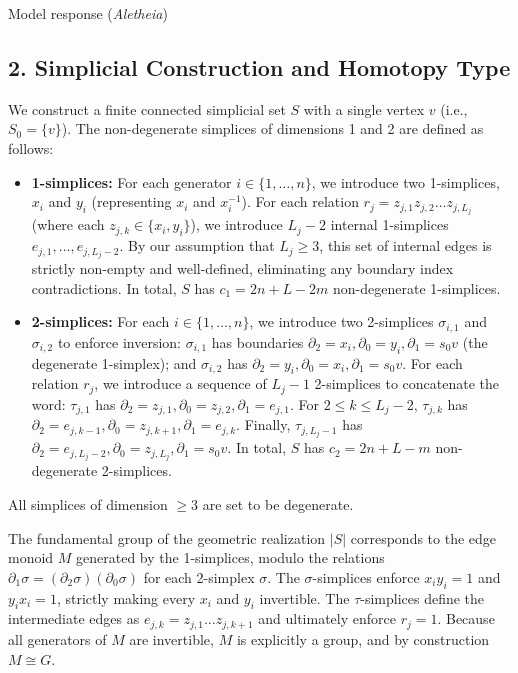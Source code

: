 \documentclass{article}
\theoremstyle{plain}
\theoremstyle{definition}
\begin{document}
\begin{solution}{Model response (\emph{Aletheia})}
\subsection*{2. Simplicial Construction and Homotopy Type}
We construct a finite connected simplicial set $S$ with a single vertex $v$ (i.e., $S_0 = \{v\}$). The non-degenerate simplices of dimensions 1 and 2 are defined as follows:
\begin{itemize}
    \item \textbf{1-simplices:} For each generator $i \in \{1, \dots, n\}$, we introduce two 1-simplices, $x_i$ and $y_i$ (representing $x_i$ and $x_i^{-1}$). For each relation $r_j = z_{j,1} z_{j,2} \dots z_{j,L_j}$ (where each $z_{j,k} \in \{x_i, y_i\}$), we introduce $L_j - 2$ internal 1-simplices $e_{j,1}, \dots, e_{j,L_j-2}$. By our assumption that $L_j \ge 3$, this set of internal edges is strictly non-empty and well-defined, eliminating any boundary index contradictions. In total, $S$ has $c_1 = 2n + L - 2m$ non-degenerate 1-simplices.
    \item \textbf{2-simplices:} For each $i \in \{1,\dots,n\}$, we introduce two 2-simplices $\sigma_{i,1}$ and $\sigma_{i,2}$ to enforce inversion: $\sigma_{i,1}$ has boundaries $\partial_2 = x_i, \partial_0 = y_i, \partial_1 = s_0v$ (the degenerate 1-simplex); and $\sigma_{i,2}$ has $\partial_2 = y_i, \partial_0 = x_i, \partial_1 = s_0v$.
    For each relation $r_j$, we introduce a sequence of $L_j - 1$ 2-simplices to concatenate the word: $\tau_{j,1}$ has $\partial_2 = z_{j,1}, \partial_0 = z_{j,2}, \partial_1 = e_{j,1}$. For $2 \le k \le L_j - 2$, $\tau_{j,k}$ has $\partial_2 = e_{j,k-1}, \partial_0 = z_{j,k+1}, \partial_1 = e_{j,k}$. Finally, $\tau_{j,L_j-1}$ has $\partial_2 = e_{j,L_j-2}, \partial_0 = z_{j,L_j}, \partial_1 = s_0v$. In total, $S$ has $c_2 = 2n + L - m$ non-degenerate 2-simplices.
\end{itemize}
All simplices of dimension $\ge 3$ are set to be degenerate.

The fundamental group of the geometric realization $|S|$ corresponds to the edge monoid $M$ generated by the 1-simplices, modulo the relations $\partial_1 \sigma = (\partial_2 \sigma)(\partial_0 \sigma)$ for each 2-simplex $\sigma$. The $\sigma$-simplices enforce $x_i y_i = 1$ and $y_i x_i = 1$, strictly making every $x_i$ and $y_i$ invertible. The $\tau$-simplices define the intermediate edges as $e_{j,k} = z_{j,1} \dots z_{j,k+1}$ and ultimately enforce $r_j = 1$. Because all generators of $M$ are invertible, $M$ is explicitly a group, and by construction $M \cong G$.


\end{solution}
\end{document}
